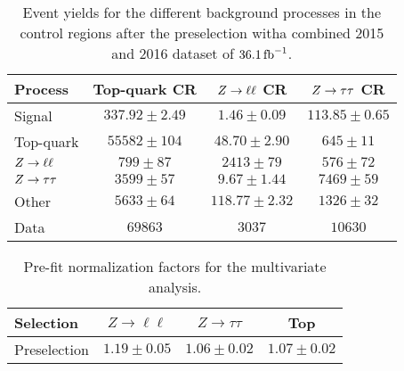 \begin{table}[htpb]
    \centering
    \caption{Event yields for the different background processes in the control regions after the preselection witha combined 2015 and 2016 dataset of $\SI{36.1}{\invfb}$.}\label{tab:nfs:yields}
    \begin{tabular}{lccc}
        \toprule
        Process     & Top-quark CR      & $Z \to \ell \ell$ CR & $Z \to \tau \tau$ CR \\ \midrule
        Signal      & $ 337.92  \pm 2.49    $  &$  1.46 \pm 0.09    $ & $113.85 \pm 0.65 $ \\
        Top-quark   & $ 55582 \pm 104 $  &$  48.70 \pm 2.90   $ & $645 \pm 11$ \\
        $Z \to \ell \ell$      & $ 799 \pm 87  $  &$  2413 \pm 79$ & $576 \pm 72$  \\
        $Z \to \tau \tau$  & $ 3599 \pm 57  $  &$  9.67 \pm 1.44   $ & $7469 \pm 59$ \\
        Other       & $ 5633 \pm 64  $  &$  118.77 \pm 2.32  $ & $1326 \pm 32$ \\
        Data        & $ 69863            $  &$  3037           $ & $10630         $  \\
        \bottomrule
    \end{tabular}
\end{table}

\begin{table}[htpb]
    \centering
    \caption{Pre-fit normalization factors for the multivariate analysis.}\label{tab:background_estimation:nfs}
    \begin{tabular}{lccc}
        \toprule
        Selection        & $Z \to \ell\ell$ & $Z \to \tau\tau$ & Top \\ \midrule
        Preselection    & $1.19 \pm 0.05$ & $1.06 \pm 0.02$ & $1.07 \pm 0.02$ \\
        \bottomrule
    \end{tabular}
\end{table}

